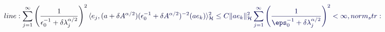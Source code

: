 \documentclass[12pt]{article}
\begin{document}
\makeatletter
\renewcommand*{\@textcolor}[3]{%
  \protect\leavevmode
  \begingroup
    \color#1{#2}#3%
  \endgroup
}
\makeatother
\begin{displaymath}
\mathcolor[RGB]{0,0,15}{line:
\sum_{j=1}^{\infty}\left(\frac{1}{\epsilon_0^{-1}+\delta\lambda_j^{\alpha/2}}\right)^2\langle} \mathcolor[RGB]{0,0,30}{e_j,(a+\delta} \mathcolor[RGB]{0,0,45}{A^{\alpha/2})(\epsilon_0^{-1}+\delta} \mathcolor[RGB]{0,0,60}{A^{\alpha/2})^{-2}(ae_k)\rangle_{\mathcal{H}}^2\leq} \mathcolor[RGB]{0,0,75}{C\|ae_k\|_{\mathcal{H}}^2\sum_{j=1}^{\infty}\left(\frac{1}{\eps_0^{-1}+\delta\lambda_j^{\alpha/2}}\right)^{2}<\infty,

norm_str:}
\end{displaymath}
\end{document}
